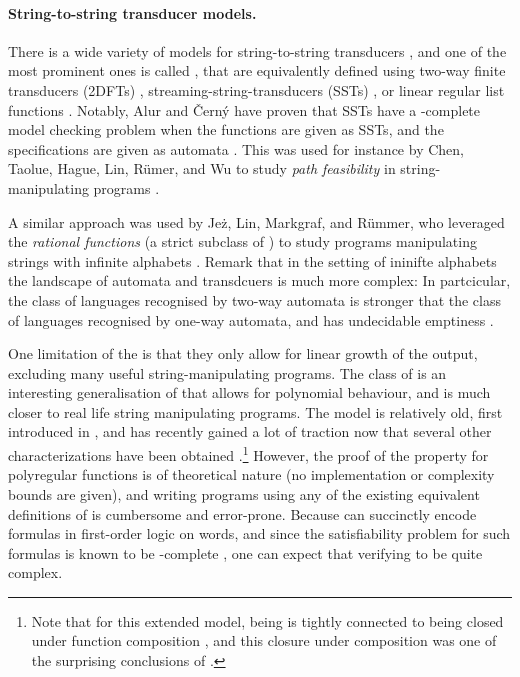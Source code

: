 \paragraph{String-to-string transducer models.} There is a wide variety of
models for string-to-string transducers \cite{MUSC19}, and one of the most
prominent ones is called , that are
equivalently defined using two-way finite transducers (2DFTs)
\cite{RASCO59}, streaming-string-transducers (SSTs) \cite{ALUR11}, or linear
regular list functions \cite{BDK18}. Notably, Alur and Černý have proven
that SSTs have a \PSPACE-complete model checking problem when the functions are
given as SSTs, and the specifications are given as automata
\cite[Theorem 13]{ALCE11}. This was used for instance by Chen, Taolue, Hague,
Lin, Rümer, and Wu to study \emph{path feasibility} in string-manipulating
programs \cite{CHLRW19}.

A similar approach was used by Jeż, Lin, Markgraf, and Rümmer, who leveraged
the \emph{rational functions} (a strict subclass of ) to study programs manipulating strings with infinite alphabets
\cite{KAFR94}. Remark that in the setting of ininifte alphabets the landscape
of automata and transdcuers is much more complex: In partcicular, the class of
languages recognised by two-way automata is stronger that the class of
languages recognised by one-way automata, and has undecidable emptiness
\cite[Figure 1.1]{BOJA19}.

\AP One limitation of the  is that they only 
allow for linear growth of the output, excluding many useful string-manipulating 
programs. The class of  is an interesting 
generalisation of  that allows for polynomial behaviour, 
and is much closer to real life string manipulating programs. The model 
is relatively old, first introduced in \cite{ENMA02},
and has recently gained a lot of traction now that
several other characterizations have been obtained
\cite{bojanczyk2018polyregular,bojanczyk2019string}.\footnote{Note that for this extended model, being
   is tightly connected to being closed under
function composition \cite[Proposition III.3]{FIRELH25}, and this closure under
composition was one of the surprising conclusions of
\cite{bojanczyk2018polyregular}.} However, the proof of the  property for polyregular functions is of theoretical nature (no
implementation or complexity bounds are given), and writing programs using any
of the existing equivalent definitions of  is
cumbersome and error-prone. Because  can succinctly
encode formulas in first-order logic on words, and
since the satisfiability problem for such formulas is known to be
\TOWER-complete \cite[Theorem 13.5]{REINH02}, one can expect that verifying
 to be quite complex.


